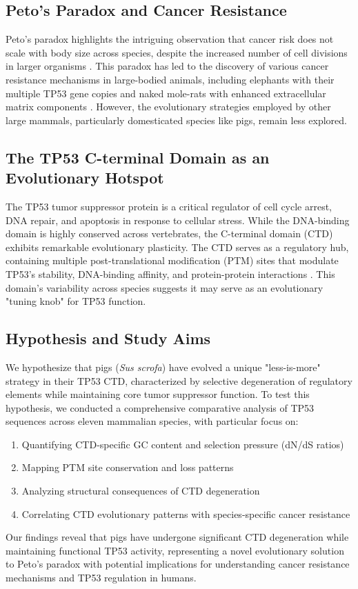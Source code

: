 \subsection{Peto's Paradox and Cancer Resistance}
Peto's paradox highlights the intriguing observation that cancer risk does not scale with body size across species, despite the increased number of cell divisions in larger organisms \citep{peto1977epidemiology}. This paradox has led to the discovery of various cancer resistance mechanisms in large-bodied animals, including elephants with their multiple TP53 gene copies \citep{sulak2016tp53} and naked mole-rats with enhanced extracellular matrix components \citep{tian2013high}. However, the evolutionary strategies employed by other large mammals, particularly domesticated species like pigs, remain less explored.

\subsection{The TP53 C-terminal Domain as an Evolutionary Hotspot}
The TP53 tumor suppressor protein is a critical regulator of cell cycle arrest, DNA repair, and apoptosis in response to cellular stress. While the DNA-binding domain is highly conserved across vertebrates, the C-terminal domain (CTD) exhibits remarkable evolutionary plasticity. The CTD serves as a regulatory hub, containing multiple post-translational modification (PTM) sites that modulate TP53's stability, DNA-binding affinity, and protein-protein interactions \citep{kruse2009mcp}. This domain's variability across species suggests it may serve as an evolutionary "tuning knob" for TP53 function.

\subsection{Hypothesis and Study Aims}
We hypothesize that pigs (\textit{Sus scrofa}) have evolved a unique "less-is-more" strategy in their TP53 CTD, characterized by selective degeneration of regulatory elements while maintaining core tumor suppressor function. To test this hypothesis, we conducted a comprehensive comparative analysis of TP53 sequences across eleven mammalian species, with particular focus on:

\begin{enumerate}
    \item Quantifying CTD-specific GC content and selection pressure (dN/dS ratios)
    \item Mapping PTM site conservation and loss patterns
    \item Analyzing structural consequences of CTD degeneration
    \item Correlating CTD evolutionary patterns with species-specific cancer resistance
\end{enumerate}

Our findings reveal that pigs have undergone significant CTD degeneration while maintaining functional TP53 activity, representing a novel evolutionary solution to Peto's paradox with potential implications for understanding cancer resistance mechanisms and TP53 regulation in humans.

